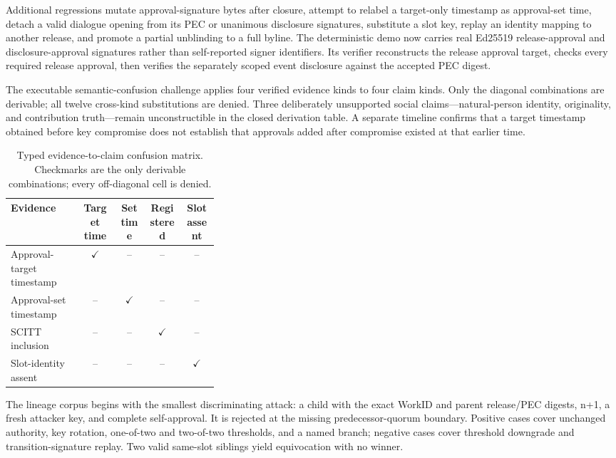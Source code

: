 \documentclass[11pt]{article}
\begin{document}
Additional regressions mutate approval-signature bytes after closure, attempt
to relabel a target-only timestamp as approval-set time, detach a valid dialogue
opening from its PEC or unanimous disclosure signatures, substitute a slot
key, replay an identity mapping to another release, and promote a partial
unblinding to a full byline. The deterministic demo now carries real Ed25519
release-approval and disclosure-approval signatures rather than self-reported
signer identifiers. Its verifier reconstructs the release approval target,
checks every required release approval, then verifies the separately scoped
event disclosure against the accepted PEC digest.

The executable semantic-confusion challenge applies four verified evidence
kinds to four claim kinds. Only the diagonal combinations are derivable; all
twelve cross-kind substitutions are denied. Three deliberately unsupported
social claims---natural-person identity, originality, and contribution
truth---remain unconstructible in the closed derivation table. A separate
timeline confirms that a target timestamp obtained before key compromise does
not establish that approvals added after compromise existed at that earlier
time.

\begin{table}[H]
\centering
\caption{Typed evidence-to-claim confusion matrix. Checkmarks are the only
derivable combinations; every off-diagonal cell is denied.}
\begin{tabular}{p{0.34\linewidth}cccc}
\toprule
Evidence & Target time & Set time & Registered & Slot assent \\
\midrule
Approval-target timestamp & $\checkmark$ & -- & -- & -- \\
Approval-set timestamp & -- & $\checkmark$ & -- & -- \\
SCITT inclusion & -- & -- & $\checkmark$ & -- \\
Slot-identity assent & -- & -- & -- & $\checkmark$ \\
\bottomrule
\end{tabular}
\end{table}

The lineage corpus begins with the smallest discriminating attack: a child
with the exact WorkID and parent release/PEC digests, n+1, a fresh attacker
key, and complete self-approval. It is rejected at the missing
predecessor-quorum boundary. Positive cases cover unchanged authority, key
rotation, one-of-two and two-of-two thresholds, and a named branch; negative
cases cover threshold downgrade and transition-signature replay. Two valid
same-slot siblings yield equivocation with no winner.
\end{document}
